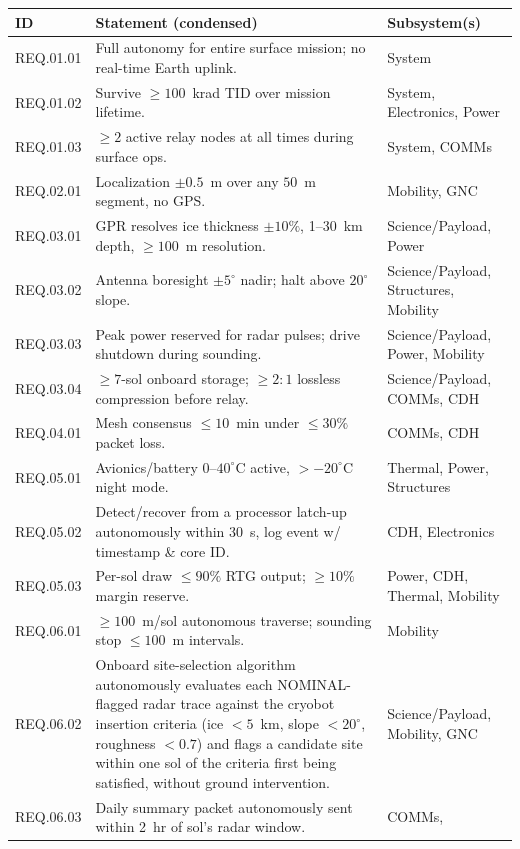 \documentclass[11pt]{article}
\begin{document}
\begin{appendices}
\begin{longtable}{p{1.6cm}p{8.6cm}p{3cm}}
\toprule
\textbf{ID} & \textbf{Statement (condensed)} & \textbf{Subsystem(s)} \\
\midrule
\endhead
REQ.01.01 & Full autonomy for entire surface mission; no real-time Earth uplink. & System \\
REQ.01.02 & Survive $\geq 100$~krad TID over mission lifetime. & System, Electronics, Power \\
REQ.01.03 & $\geq 2$ active relay nodes at all times during surface ops. & System, COMMs \\
REQ.02.01 & Localization $\pm 0.5$~m over any $50$~m segment, no GPS. & Mobility, GNC \\
REQ.03.01 & GPR resolves ice thickness $\pm 10\%$, 1--30~km depth, $\geq 100$~m resolution. &
Science/Payload, Power \\
REQ.03.02 & Antenna boresight $\pm 5^\circ$ nadir; halt above $20^\circ$ slope. &
Science/Payload, Structures, Mobility \\
REQ.03.03 & Peak power reserved for radar pulses; drive shutdown during sounding. &
Science/Payload, Power, Mobility \\
REQ.03.04 & $\geq 7$-sol onboard storage; $\geq 2{:}1$ lossless compression before relay. &
Science/Payload, COMMs, CDH \\
REQ.04.01 & Mesh consensus $\leq 10$~min under $\leq 30\%$ packet loss. & COMMs, CDH \\
REQ.05.01 & Avionics/battery $0$--$40^\circ$C active, $>-20^\circ$C night mode. & Thermal,
Power, Structures \\
REQ.05.02 & Detect/recover from a processor latch-up autonomously within $30$~s, log event w/
timestamp \& core ID. & CDH, Electronics \\
REQ.05.03 & Per-sol draw $\leq 90\%$ RTG output; $\geq 10\%$ margin reserve. & Power, CDH,
Thermal, Mobility \\
REQ.06.01 & $\geq 100$~m/sol autonomous traverse; sounding stop $\leq 100$~m intervals. &
Mobility \\
REQ.06.02 & Onboard site-selection algorithm autonomously evaluates each NOMINAL-flagged radar
trace against the cryobot insertion criteria (ice $<5$~km, slope $<20^\circ$, roughness $<0.7$)
and flags a candidate site within one sol of the criteria first being satisfied, without ground
intervention. & Science/Payload, Mobility, GNC \\
REQ.06.03 & Daily summary packet autonomously sent within 2~hr of sol's radar window. & COMMs,

\end{longtable}
\end{appendices}
\end{document}
